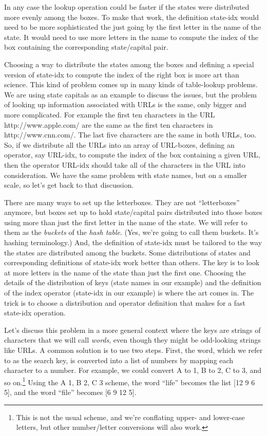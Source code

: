 In any case the \textsf{lookup} operation could be faster
if the states were distributed more evenly among the boxes.
To make that work, the definition
\textsf{state-idx} would need to be more sophisticated
the just going by the first letter in the name of the state.
It would need to use more letters in the name
to compute the index of the box containing the corresponding
state/capital pair.

Choosing a way to distribute the states among the boxes
and defining a special version of \textsf{state-idx}
to compute the index of the right box is 
more art than science. This kind of problem comes up in
many kinds of table-lookup problems. We are using
state capitals as an example to discuss the issues,
but the problem of looking up information associated
with URLs is the same, only bigger and more complicated.
For example the first ten characters in the URL
http://www.apple.com/ are the same as the first ten
characters in http://www.cnn.com/. The last five
characters are the same in both URLs, too.
So, if we distribute all the URLs into an array of URL-boxes,
defining an operator, say \textsf{URL-idx}, to compute the
index of the box containing a given URL,
then the operator \textsf{URL-idx} should take
all of the characters in the URL into consideration.
We have the same problem with state names, but on a
smaller scale, so let's get back to that discussion.

There are many ways to set up the letterboxes.
They are not ``letterboxes'' anymore, but boxes set up to hold
state/capital pairs distributed into those boxes using
more than just the first letter in the name of the state.
We will refer to them as the
\emph{buckets}
of the \emph{hash table}.
(Yes, we're going to call them buckets. It's hashing terminology.)
And, the definition of \textsf{state-idx} must be
tailored to the way the states are distributed among the buckets.
Some distributions of states and corresponding definitions
of \textsf{state-idx} work better than others.
The key is to look at more letters in the name of the state
than just the first one.
Choosing the details of the distribution of keys
(state names in our example) and the definition of the index operator
(\textsf{state-idx} in our example) is where the art comes in.
The trick is to choose a distribution and operator
definition that makes for a fast \textsf{state-idx} operation.

Let's discuss this problem in a more general context
where the keys are strings of characters that we will
call \emph{words}, even though they might be odd-looking
strings like URLs.
A common solution is to use two steps. First, the word,
which we refer to as the search key, is converted
into a list of numbers by mapping each character to a number. For
example, we could convert A to 1, B to 2, C to 3,
and so on.\footnote{This is not the usual scheme,
and we're conflating upper- and
lower-case letters, but other number/letter conversions  will also work.}
Using the A 1, B 2, C 3 scheme, the word ``life'' becomes the list
\textsf{[12 9 6 5]},
and the word ``file'' becomes \textsf{[6 9 12 5]}.

